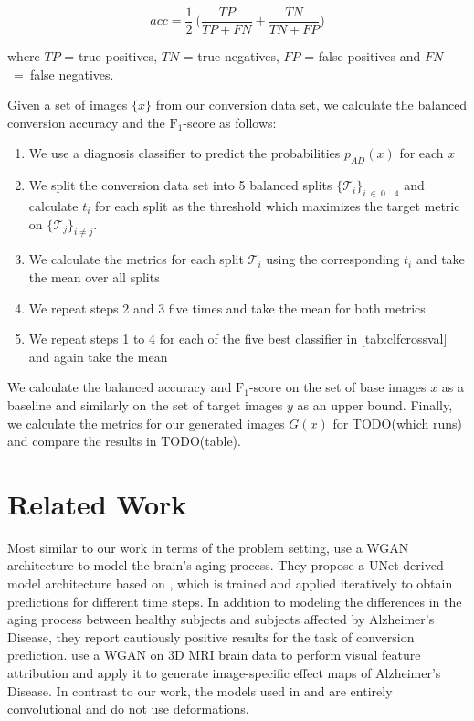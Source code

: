 \begin{equation}
	acc = \frac{1}{2}\ \bigg(\frac{TP}{TP + FN} + \frac{TN}{TN + FP}\bigg)
\end{equation}

where $TP$ = true positives, $TN$ = true negatives, $FP$ = false positives and $FN$~=~false negatives.

Given a set of images $\{x\}$ from our conversion data set, we calculate the balanced conversion accuracy and the $\text{F}_1$-score as follows:
\begin{enumerate}
	\item We use a diagnosis classifier to predict the probabilities $p_{AD}(x)$ for each $x$
	\item We split the conversion data set into 5 balanced splits $\{\mathcal{T}_i\}_{i\ \in\ 0\ ..\ 4}$ and calculate $t_i$ for each split as the threshold which maximizes the target metric on $\{\mathcal{T}_j\}_{i \neq j}$.
	\item We calculate the metrics for each split $\mathcal{T}_i$ using the corresponding $t_i$ and take the mean over all splits
	\item We repeat steps 2 and 3 five times and take the mean for both metrics
	\item We repeat steps 1 to 4 for each of the five best classifier in \autoref{tab:clfcrossval} and again take the mean
\end{enumerate}

We calculate the balanced accuracy and $\text{F}_1$-score on the set of base images $x$ as a baseline and similarly on the set of target images $y$ as an upper bound. Finally, we calculate the metrics for our generated images $G(x)$ for TODO(which runs) and compare the results in TODO(table).



\chapter{Related Work}
Most similar to our work in terms of the problem setting, \cite{wegmayr} use a WGAN architecture to model the brain's aging process. They propose a UNet-derived model architecture based on \cite{baumgartner2018visual}, which is trained and applied iteratively to obtain predictions for different time steps. In addition to modeling the differences in the aging process between healthy subjects and subjects affected by Alzheimer's Disease, they report cautiously positive results for the task of conversion prediction.
\cite{baumgartner2018visual} use a WGAN on 3D MRI brain data to perform visual feature attribution and apply it to generate image-specific effect maps of Alzheimer's Disease.
In contrast to our work, the models used in \cite{wegmayr} and \cite{baumgartner2018visual} are entirely convolutional and do not use deformations.

